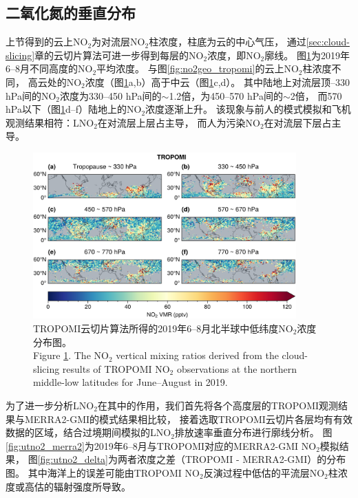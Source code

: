 \subsection{二氧化氮的垂直分布} \label{sec:no2_profile}


上节得到的云上NO$_2$为对流层NO$_2$柱浓度，柱底为云的中心气压，
通过\ref{sec:cloud-slicing}章的云切片算法可进一步得到每层的NO$_2$浓度，即NO$_2$廓线。
图\ref{fig:utno2_tropomi}为2019年6--8月不同高度的NO$_2$平均浓度。
与图\ref{fig:no2geo_tropomi}的云上NO$_2$柱浓度不同，
高云处的NO$_2$浓度（图\ref{fig:utno2_tropomi}a,b）高于中云（图\ref{fig:utno2_tropomi}c,d）。
其中陆地上对流层顶--330 hPa间的NO$_2$浓度为330--450 hPa间的$\sim$1.2倍，为450--570 hPa间的$\sim$2倍，
而570 hPa以下（图\ref{fig:utno2_tropomi}d--f）陆地上的NO$_2$浓度逐渐上升。
该现象与前人的模式模拟和飞机观测结果相符：LNO$_2$在对流层上层占主导，
而人为污染NO$_2$在对流层下层占主导\citep{Pickering.1996,Ott.2010,Laughner.2017}。


\begin{figure}[H]
    \centering
    \includegraphics[width=0.9\textwidth]{./figures/utno2_tropomi.png}
    \caption{
    TROPOMI云切片算法所得的2019年6--8月北半球中低纬度NO$_2$浓度分布图。 \\
    Figure \ref{fig:utno2_tropomi}. The NO$_2$ vertical mixing ratios derived from the cloud-slicing results of TROPOMI NO$_2$ observations at the northern middle-low latitudes for June--August in 2019.
    }
    \label{fig:utno2_tropomi}
\end{figure}

为了进一步分析LNO$_2$在其中的作用，我们首先将各个高度层的TROPOMI观测结果与MERRA2-GMI的模式结果相比较，
接着选取TROPOMI云切片各层均有有效数据的区域，结合过境期间模拟的LNO$_2$排放速率垂直分布进行廓线分析。
图\ref{fig:utno2_merra2}为2019年6--8月与TROPOMI对应的MERRA2-GMI NO$_2$模拟结果，
图\ref{fig:utno2_delta}为两者浓度之差（TROPOMI - MERRA2-GMI）的分布图。
其中海洋上的误差可能由TROPOMI NO$_2$反演过程中低估的平流层NO$_2$柱浓度或高估的辐射强度所导致\citep{VanGeffen.2020}。

